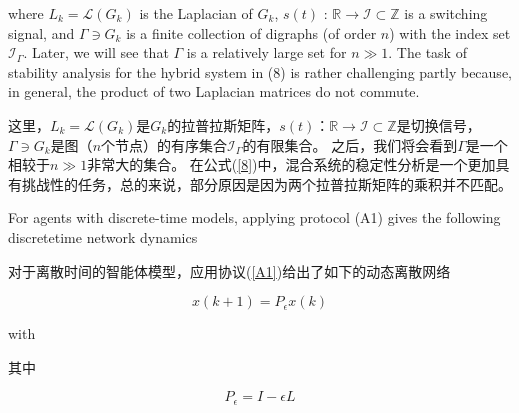 \documentclass{article}
\begin{document}

{\color[gray]{0.5}
\noindent where $L_k = \mathcal{L}(G_k)$ is the Laplacian of $G_k$, $s(t)$ : $\mathbb{R}\rightarrow \mathcal{I} \subset \mathbb{Z}$ is a switching signal, and $\Gamma\ni G_k$ is a ﬁnite collection of digraphs (of order $n$) with the index set $\mathcal{I}_\Gamma$. 
Later, we will see that $\Gamma$ is a relatively large set for $n\gg 1$. 
The task of stability analysis for the hybrid system in (8) is rather challenging partly because, in general, the product of two Laplacian matrices do not commute.
}

\noindent 这里，$L_k = \mathcal{L}(G_k)$是$G_k$的拉普拉斯矩阵，$s(t)$：$\mathbb{R}\rightarrow \mathcal{I} \subset \mathbb{Z}$是切换信号，$\Gamma\ni G_k$是图（$n$个节点）的有序集合$\mathcal{I}_\Gamma$的有限集合。
之后，我们将会看到$\Gamma$是一个相较于$n\gg 1$非常大的集合。
在公式(\ref{8})中，混合系统的稳定性分析是一个更加具有挑战性的任务，总的来说，部分原因是因为两个拉普拉斯矩阵的乘积并不匹配。

{\color[gray]{0.5}
For agents with discrete-time models, applying protocol (A1) gives the following discretetime network dynamics
}

对于离散时间的智能体模型，应用协议(\ref{A1})给出了如下的动态离散网络

\begin{equation}
    x(k+1) = P_\epsilon x(k)
    \tag{9}
    \label{9}
\end{equation}


{\color[gray]{0.5}
\noindent with
}

\noindent 其中

\begin{equation}
    P_\epsilon = I - \epsilon L
    \tag{10}
    \label{10}
\end{equation}

\end{document}
